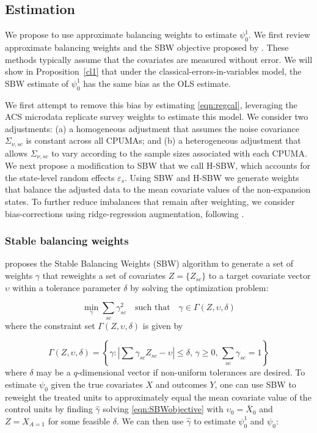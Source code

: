 \documentclass[aoas]{imsart}
\theoremstyle{plain}
\theoremstyle{remark}
\begin{document}
\subsection{Estimation}\label{ssec:estimation}

We propose to use approximate balancing weights to estimate $\psi_0^1$. We first review approximate balancing weights and the SBW objective proposed by \cite{zubizarreta2015stable}. These methods typically assume that the covariates are measured without error. We will show in Proposition~\ref{cl1} that under the classical-errors-in-variables model, the SBW estimate of $\psi_0^1$ has the same bias as the OLS estimate.

We first attempt to remove this bias by estimating \eqref{eqn:regcal}, leveraging the ACS microdata replicate survey weights to estimate this model. We consider two adjustments: (a) a homogeneous adjustment that assumes the noise covariance $\Sigma_{\nu, sc}$ is constant across all CPUMAs; and (b) a heterogeneous adjustment that allows $\Sigma_{\nu,sc}$ to vary according to the sample sizes associated with each CPUMA. We next propose a modification to SBW that we call H-SBW, which accounts for the state-level random effects $\varepsilon_s$. Using SBW and H-SBW we generate weights that balance the adjusted data to the mean covariate values of the non-expansion states. To further reduce imbalances that remain after weighting, we consider bias-corrections using ridge-regression augmentation, following \cite{ben2021augmented}. 

\subsubsection{Stable balancing weights}\label{ssec:SBW}

\cite{zubizarreta2015stable} proposes the Stable Balancing Weights (SBW) algorithm to generate a set of weights $\gamma$ that reweights a set of covariates $Z = \{Z_{sc}\}$ to a target covariate vector $\upsilon$ within a tolerance parameter $\delta$ by solving the optimization problem:

\begin{equation}\label{eqn:SBWobjective}
 \min_{\gamma} \sum_{sc} \gamma_{sc}^2 \quad \text{such that} \quad \gamma \in \Gamma(Z, \upsilon, \delta)
\end{equation}
%
where the constraint set $\Gamma(Z, \upsilon, \delta)$ is given by

\[ \Gamma(Z, \upsilon, \delta) = \left\{\gamma: \left|\sum \gamma_{sc} Z_{sc}  - \upsilon\right| \leq \delta,\, \gamma \geq 0,\, \sum_{sc} \gamma_{sc} = 1\right\}\]
%
where $\delta$ may be a $q$-dimensional vector if non-uniform tolerances are desired. To estimate $\psi_0$ given the true covariates $X$ and outcomes $Y$, one can use SBW to reweight the treated units to approximately equal the mean covariate value of the control units by finding $\hat{\gamma}$ solving \eqref{eqn:SBWobjective} with $\upsilon_0 = \bar{X}_0$ and $Z = X_{A=1}$ for some feasible $\delta$. We can then use $\hat{\gamma}$ to estimate $\psi_0^1$ and $\psi_0$:
\end{document}
